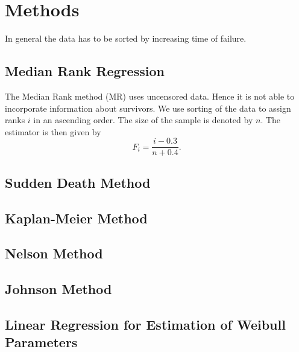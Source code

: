 \section{Methods}
In general the data has to be sorted by increasing time of failure.

\subsection{Median Rank Regression}
The Median Rank method (MR) uses uncensored data. Hence it is not able to incorporate information about survivors. 
We use sorting of the data to assign ranks $i$ in an ascending order. The size of the sample is denoted by $n$. The estimator is then given by
$$ F_i = \frac{i - 0.3}{n + 0.4}.$$

\subsection{Sudden Death Method}

\subsection{Kaplan-Meier Method}

\subsection{Nelson Method}

\subsection{Johnson Method}

\subsection{Linear Regression for Estimation of Weibull Parameters}
